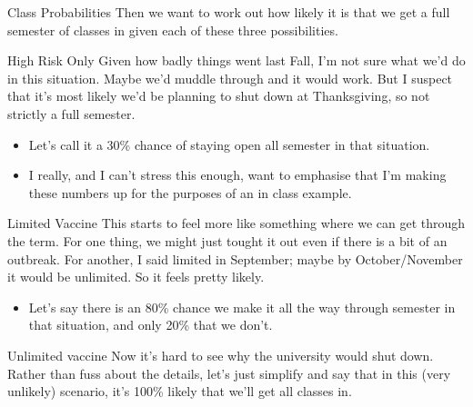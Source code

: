 \documentclass[
  ignorenonframetext,
]{beamer}
\providecommand{\tightlist}{%
  \setlength{\itemsep}{0pt}\setlength{\parskip}{0pt}}
\begin{document}
\begin{frame}{Class Probabilities}
\protect\hypertarget{class-probabilities}{}
Then we want to work out how likely it is that we get a full semester of
classes in given each of these three possibilities.
\end{frame}

\begin{frame}{High Risk Only}
\protect\hypertarget{high-risk-only}{}
Given how badly things went last Fall, I'm not sure what we'd do in this
situation. Maybe we'd muddle through and it would work. But I suspect
that it's most likely we'd be planning to shut down at Thanksgiving, so
not strictly a full semester.

\begin{itemize}[<+->]
\tightlist
\item
  Let's call it a 30\% chance of staying open all semester in that
  situation.
\item
  I really, and I can't stress this enough, want to emphasise that I'm
  making these numbers up for the purposes of an in class example.
\end{itemize}
\end{frame}

\begin{frame}{Limited Vaccine}
\protect\hypertarget{limited-vaccine}{}
This starts to feel more like something where we can get through the
term. For one thing, we might just tought it out even if there is a bit
of an outbreak. For another, I said limited in September; maybe by
October/November it would be unlimited. So it feels pretty likely.

\begin{itemize}
\tightlist
\item
  Let's say there is an 80\% chance we make it all the way through
  semester in that situation, and only 20\% that we don't.
\end{itemize}
\end{frame}

\begin{frame}{Unlimited vaccine}
\protect\hypertarget{unlimited-vaccine}{}
Now it's hard to see why the university would shut down. Rather than
fuss about the details, let's just simplify and say that in this (very
unlikely) scenario, it's 100\% likely that we'll get all classes in.
\end{frame}
\end{document}
